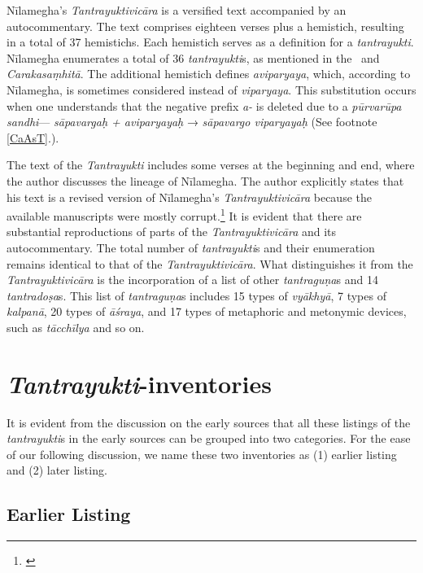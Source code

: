 Nīlamegha's \emph{Tantrayuktivicāra} is a versified text accompanied by an 
autocommentary. The text comprises eighteen verses plus a hemistich, resulting 
in 
a total of 37 hemistichs. Each hemistich serves as a definition for a 
\emph{tantrayukti}. Nīlamegha enumerates a total of 36 \emph{tantrayukti}s, 
as 
mentioned in the \AS\ and \emph{Carakasaṃhitā}. The additional hemistich 
defines \emph{aviparyaya}, which, according to Nīlamegha, is sometimes 
considered instead of \emph{viparyaya}. This substitution occurs when one 
understands that the negative prefix \emph{a-} is deleted due to a 
\emph{pūrvarūpa sandhi}--- \emph{sāpavargaḥ + aviparyayaḥ} → 
\emph{sāpavargo viparyayaḥ} (See footnote \ref{CaAsT}.).

The text of the \emph{Tantrayukti} includes some verses at the beginning and 
end, where the author discusses the lineage of Nīlamegha. The author explicitly 
states that his text is a revised version of Nīlamegha's \emph{Tantrayuktivicāra} 
because the available manuscripts were mostly 
corrupt.\footnote{
	\cite[1]{nara-1949}} 
It is evident that there are substantial reproductions of parts of the 
\emph{Tantrayuktivicāra} and its autocommentary. The total number of 
\emph{tantrayukti}s and their enumeration remains identical to that of the 
\emph{Tantrayuktivicāra}. What distinguishes it from the 
\emph{Tantrayuktivicāra} is the incorporation of a list of other 
\emph{tantraguṇa}s and 14 \emph{tantradoṣa}s. This list of 
\emph{tantraguṇa}s 
includes 15 types of \emph{vyākhyā}, 7 types of \emph{kalpanā}, 20 types of 
\emph{āśraya}, and 17 types of metaphoric and metonymic devices, such as 
\emph{tācchīlya} and so on.

\section{\emph{Tantrayukti}-inventories}

It is evident from the discussion on the early sources that all these listings of the 
\emph{tantrayukti}s in the early sources can be grouped into two categories. For 
the ease of our following discussion, we name these two inventories as (1) earlier 
listing and (2) later listing.

\subsection{Earlier Listing}

